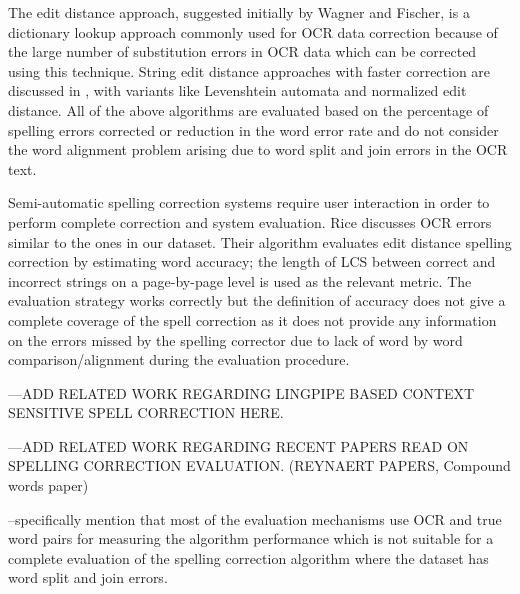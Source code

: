 The edit distance approach, suggested initially by Wagner and Fischer\cite{wagner1974string}, is a dictionary lookup approach commonly used for OCR data correction because of the large number of substitution errors in OCR data  \cite{kukich1992techniques}\cite{christen2006comparison} which can be corrected using this technique. String edit distance approaches with faster correction are discussed in \cite{marzal1993computation},\cite{schulz2002fast}  with variants like Levenshtein automata and normalized edit distance.
All of the above algorithms are evaluated based on the percentage of spelling errors corrected or reduction in the word error rate and do not consider the word alignment problem arising due to word split and join errors in the OCR text. 

Semi-automatic spelling correction systems \cite{taghva2001ocrspell} require user interaction in order to perform complete correction and system evaluation. Rice\cite{rice1996measuring} discusses OCR errors similar to the ones in our dataset. Their algorithm evaluates edit distance spelling correction by estimating word accuracy; the length of LCS between correct and incorrect strings on a page-by-page level is used as the relevant metric. 
The evaluation strategy works correctly but the definition of accuracy does not give a complete coverage of the spell correction as it does not provide any information on the errors missed by the spelling corrector due to lack of word by word comparison/alignment during the evaluation procedure.

---ADD RELATED WORK REGARDING LINGPIPE BASED CONTEXT SENSITIVE SPELL CORRECTION HERE. 

---ADD RELATED WORK REGARDING RECENT PAPERS READ ON SPELLING CORRECTION EVALUATION. (REYNAERT PAPERS, Compound words paper)

--specifically mention that most of the evaluation mechanisms use OCR and true word pairs for measuring the algorithm performance which is not suitable for a complete evaluation of the spelling correction algorithm where the dataset has word split and join errors.


